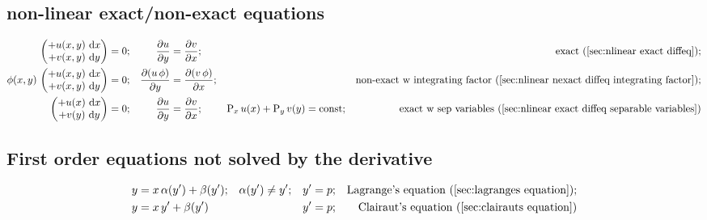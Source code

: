\documentclass["AM3C-Slides_annotations.tex"]{subfiles}
\begin{document}
\begin{minipage}{60em}
\begin{sectionBox}
\begin{minipage}{60em}
      \subsection*{non-linear exact/non-exact equations}
      \begin{tcolorbox}
        \begin{align*}
          \begin{pmatrix}
            + u(x,y)\,\odif{x} 
            \\
            + v(x,y)\,\odif{y}
          \end{pmatrix}
          &= 0
          ; &
          \pdv{u}{y} &= \pdv{v}{x}
          ; &
          &&
          \text{exact (\ref{sec:nlinear exact diffeq})}
          ; \\
          \phi(x,y)
          \,\begin{pmatrix}
            + u(x,y)\,\odif{x} 
            \\
            + v(x,y)\,\odif{y}
          \end{pmatrix}
          &= 0
          ; &
          \pdv{(u\,\phi)}{y} &= \pdv{(v\,\phi)}{x}
          ; &
          &&
          \text{non-exact w integrating factor (\ref{sec:nlinear nexact diffeq integrating factor})}
          ; \\
          \begin{pmatrix}
            + u(x)\,\odif{x} 
            \\
            + v(y)\,\odif{y}
          \end{pmatrix}
          &= 0
          ; &
          \pdv{u}{y} &= \pdv{v}{x}
          ; & 
          \prim_x{u(x)} + \prim_y{v(y)} &= \text{const}
          ; & 
          \text{exact w sep variables (\ref{sec:nlinear exact diffeq separable variables})}
        \end{align*}
      \end{tcolorbox}
    \end{minipage}

    \begin{minipage}{40em}
      \subsection*{First order equations not solved by the derivative}
      \begin{tcolorbox}
        \begin{align*}
          y &= x\,\alpha(y') + \beta(y')
          ; &
          \alpha(y') &\neq y'
          ; &
          y'&=p
          ; & \text{Lagrange's equation (\ref{sec:lagranges equation})}
          ; \\
          y &= x\,y' + \beta(y')
          && &
          y'&=p
          ; & \text{Clairaut's equation (\ref{sec:clairauts equation})}
        \end{align*}
      \end{tcolorbox}
    \end{minipage}


\end{sectionBox}
\end{minipage}
\end{document}

